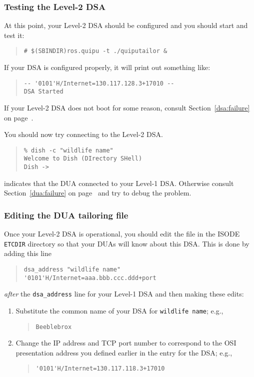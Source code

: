 \subsubsection	{Testing the Level-2 DSA}
At this point,
your Level-2 DSA should be configured and you should start and test it:
\begin{quote}\small\begin{verbatim}
# $(SBINDIR)ros.quipu -t ./quiputailor &
\end{verbatim}\end{quote}
If your DSA is configured properly,
it will print out something like:
\begin{quote}\small\begin{verbatim}
-- '0101'H/Internet=130.117.128.3+17010 --
DSA Started
\end{verbatim}\end{quote}
If your Level-2 DSA does not boot for some reason,
consult Section~\ref{dsa:failure} on page~\pageref{dsa:failure}.

You should now try connecting to the Level-2 DSA.
\begin{quote}\small\begin{verbatim}
% dish -c "wildlife name"
Welcome to Dish (DIrectory SHell)
Dish ->
\end{verbatim}\end{quote}
indicates that the DUA connected to your Level-1 DSA.
Otherwise consult Section~\ref{dua:failure} on
page~\pageref{dua:failure} and try to debug the problem.

\subsubsection	{Editing the DUA tailoring file}
Once your Level-2 DSA is operational,
you should edit the file  in the ISODE \verb"ETCDIR"
directory so that your DUAs 
will know about this DSA.
This is done by adding this line
\begin{quote}\smaller\begin{verbatim}
dsa_address "wildlife name"      '0101'H/Internet=aaa.bbb.ccc.ddd+port
\end{verbatim}\end{quote}
{\em after\/} the \verb"dsa_address" line for your Level-1 DSA
and then making these edits:
\begin{enumerate}
\item	Substitute the common name of your DSA for \verb"wildlife name"; e.g.,
\begin{quote}\small\begin{verbatim}
Beeblebrox
\end{verbatim}\end{quote}

\item	Change the IP address and TCP port number to correspond to the
	OSI presentation address you defined earlier in the entry for the
	DSA;
	e.g.,
\begin{quote}\small\begin{verbatim}
'0101'H/Internet=130.117.118.3+17010
\end{verbatim}\end{quote}
\end{enumerate}

